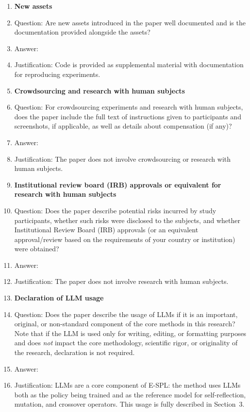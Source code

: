 \begin{enumerate}
\item {\bf New assets}
    \item[] Question: Are new assets introduced in the paper well documented and is the documentation provided alongside the assets?
    \item[] Answer: \answerYes{}
    \item[] Justification: Code is provided as supplemental material with documentation for reproducing experiments.

\item {\bf Crowdsourcing and research with human subjects}
    \item[] Question: For crowdsourcing experiments and research with human subjects, does the paper include the full text of instructions given to participants and screenshots, if applicable, as well as details about compensation (if any)?
    \item[] Answer: \answerNA{}
    \item[] Justification: The paper does not involve crowdsourcing or research with human subjects.

\item {\bf Institutional review board (IRB) approvals or equivalent for research with human subjects}
    \item[] Question: Does the paper describe potential risks incurred by study participants, whether such risks were disclosed to the subjects, and whether Institutional Review Board (IRB) approvals (or an equivalent approval/review based on the requirements of your country or institution) were obtained?
    \item[] Answer: \answerNA{}
    \item[] Justification: The paper does not involve research with human subjects.

\item {\bf Declaration of LLM usage}
    \item[] Question: Does the paper describe the usage of LLMs if it is an important, original, or non-standard component of the core methods in this research? Note that if the LLM is used only for writing, editing, or formatting purposes and does \emph{not} impact the core methodology, scientific rigor, or originality of the research, declaration is not required.
    \item[] Answer: \answerYes{}
    \item[] Justification: LLMs are a core component of E-SPL: the method uses LLMs both as the policy being trained and as the reference model for self-reflection, mutation, and crossover operators. This usage is fully described in Section~3.

\end{enumerate}
